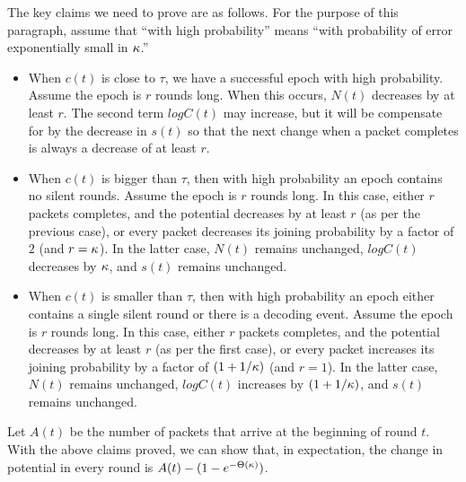 The key claims we need to prove are as follows.  For the purpose of this paragraph, assume that ``with high probability'' means ``with probability of error exponentially small in $\kappa$.''
\begin{itemize}
    \item When $c(t)$ is close to $\tau$, we have a successful epoch with high probability.  Assume the epoch is $r$ rounds long.  When this occurs, $N(t)$ decreases by at least $r$.  The second term $logC(t)$ may increase, but it will be compensate for by the decrease in $s(t)$ so that the next change when a packet completes is always a decrease of at least $r$.
    \item When $c(t)$ is bigger than $\tau$, then with high probability an epoch contains no silent rounds.  Assume the epoch is $r$ rounds long.  In this case, either $r$ packets completes, and the potential decreases by at least $r$ (as per the previous case), or every packet decreases its joining probability by a factor of $2$ (and $r = \kappa$).  In the latter case, $N(t)$ remains unchanged, $logC(t)$ decreases by $\kappa$, and $s(t)$ remains unchanged.
    \item When $c(t)$ is smaller than $\tau$, then with high probability an epoch either contains a single silent round or there is a decoding event.  Assume the epoch is $r$ rounds long.  In this case, either $r$ packets completes, and the potential decreases by at least $r$ (as per the first case), or every packet increases its joining probability by a factor of $(1 + 1/\kappa)$ (and $r = 1$).  In the latter case, $N(t)$ remains unchanged, $logC(t)$ increases by $(1 + 1/\kappa)$, and $s(t)$ remains unchanged.
\end{itemize}

Let $A(t)$ be the number of packets that arrive at the beginning of round $t$.  With the above claims proved, we can show that, in expectation, the change in potential in every round is $A(t) - (1 - e^{-\Theta(\kappa)})$.